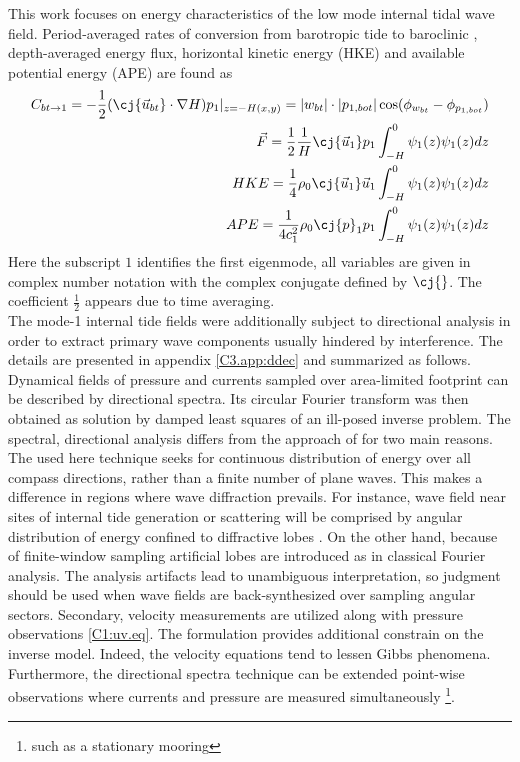 \documentclass[12pt]{article}
\begin{document}
This work focuses on energy characteristics of the low mode internal tidal wave field. 
Period-averaged rates of conversion from barotropic tide to 
baroclinic \citep{simmons2004internal, kurapov2003m}, depth-averaged energy flux, horizontal 
kinetic energy (HKE) and available potential energy (APE) are found as
\begin{align}
\label{C3.eq:conv}
C_{bt\to 1} = -\frac{1}{2}(\cj{\vec{u}_{bt}} \cdot \nabla H) p_{1}|_{z = -H(x,y)} = |w_{bt}| \cdot 
|p_{1,bot}| \cos (\phi_{w_{bt}} - \phi_{p_{1,bot}})\\
\vec{F} = \frac{1}{2} \frac{1}{H} \cj{\vec{u}_1} p_1 \int_{-H}^{0} \psi_1(z) \psi_1(z) dz\\
HKE = \frac{1}{4} \rho_0 \cj{\vec{u}_1} \vec{u}_1 \int_{-H}^{0} \psi_1(z) \psi_1(z) dz\\
APE = \frac{1}{4c_1^2} \rho_0 \cj{p}_1 {p}_1 \int_{-H}^{0} \psi_1(z) \psi_1(z) dz
\end{align}
Here the subscript $1$ identifies the first eigenmode, all variables are given in complex number 
notation with the complex conjugate defined by $\cj{}$. The coefficient $\frac{1}{2}$ appears due 
to 
time 
averaging.\\

The mode-1 internal tide fields were additionally subject to directional analysis in order to 
extract primary wave components usually hindered by interference. The details are presented in 
appendix 
\ref{C3.app:ddec} and summarized as follows. Dynamical fields of pressure and currents sampled over 
area-limited footprint can be described by directional 
spectra. Its circular Fourier 
transform was then obtained as solution by damped least squares of an ill-posed inverse problem. 
The 
spectral, directional analysis differs from the approach of \cite{zhao2010long} for two main 
reasons. The used here technique seeks for continuous distribution of 
energy over all compass directions, rather than a finite number of plane waves. This makes a 
difference in regions 
where wave diffraction prevails. For instance, wave field near sites of internal tide generation or 
scattering will be comprised by angular distribution of energy confined to diffractive lobes 
\citep[e.g.,][]{munroe2005topographic, johnston2003internal}. On 
the other hand, because of finite-window sampling artificial lobes are introduced as in classical 
Fourier analysis. The analysis artifacts lead to unambiguous interpretation, so judgment should be 
used when wave fields are back-synthesized over sampling angular sectors. Secondary, 
velocity measurements are utilized along with pressure observations \eqref{C1:uv.eq}. The 
formulation provides additional constrain on the inverse model. Indeed, the velocity equations tend 
to lessen Gibbs phenomena. Furthermore, the directional spectra technique can be extended 
point-wise observations where currents and pressure are measured simultaneously  \footnote{such as 
a stationary mooring}.\\
\end{document}
